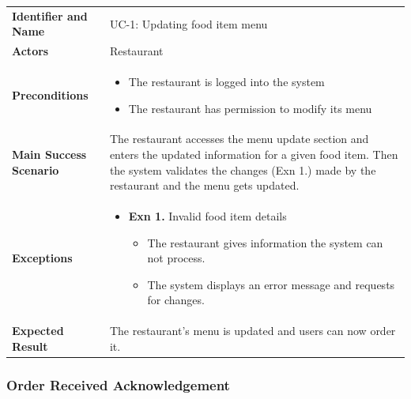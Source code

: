 \noindent
\begin{tabularx}{\textwidth}{l X}
    \textbf{Identifier and Name} & UC-1: Updating food item menu \\
    \textbf{Actors} & Restaurant \\
    \textbf{Preconditions} & 
    \begin{itemize} 
        \item The restaurant is logged into the system  
        \item The restaurant has permission to modify its menu
    \end{itemize} \\
    \textbf{Main Success Scenario} & The restaurant accesses the menu update section and enters the updated information for a given food item. Then the system validates the changes (Exn 1.) made by the restaurant and the menu gets updated. \\
    \textbf{Exceptions} & \begin{itemize} 
        \item \textbf{Exn 1.} Invalid food item details 
         \begin{itemize} 
            \item The restaurant gives information the system can not process.
            \item The system displays an error message and requests for changes.
         \end{itemize}
    \end{itemize} \\
    \textbf{Expected Result} & The restaurant's menu is updated and users can now order it. 
\end{tabularx}


\subsubsection{Order Received Acknowledgement}

